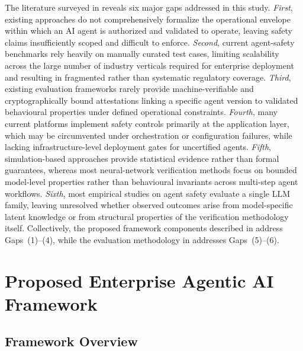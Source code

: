 \documentclass[11pt,a4paper]{article}
\begin{document}
The literature surveyed in  reveals six major
gaps addressed in this study. \emph{First}, existing approaches do
not comprehensively formalize the operational envelope within which an
AI agent is authorized and validated to operate, leaving safety claims
insufficiently scoped and difficult to enforce. \emph{Second}, current
agent-safety benchmarks \citep{liu2023agentbench, yuan2024rjudge,
andriushchenko2025agentharm, zhang2025agentsafetybench,
yin2025safeagentbench} rely heavily on manually curated test cases,
limiting scalability across the large number of industry verticals
required for enterprise deployment and resulting in fragmented rather
than systematic regulatory coverage. \emph{Third}, existing evaluation
frameworks rarely provide machine-verifiable and cryptographically
bound attestations linking a specific agent version to validated
behavioural properties under defined operational constraints.
\emph{Fourth}, many current platforms implement safety controls
primarily at the application layer, which may be circumvented under
orchestration or configuration failures, while lacking
infrastructure-level deployment gates for uncertified agents.
\emph{Fifth}, simulation-based approaches provide statistical evidence
rather than formal guarantees, whereas most neural-network
verification methods \citep{huang2020survey, katz2017reluplex,
tran2020nnv, singh2019abstract} focus on bounded model-level
properties rather than behavioural invariants across multi-step agent
workflows. \emph{Sixth}, most empirical studies on agent safety
evaluate a single LLM family, leaving unresolved whether observed
outcomes arise from model-specific latent knowledge or from structural
properties of the verification methodology itself. Collectively, the
proposed framework components described in
address Gaps~(1)--(4), while the evaluation methodology in
 addresses Gaps~(5)--(6).

\section{Proposed Enterprise Agentic AI Framework}
\label{sec:proposed-framework}

\subsection{Framework Overview}
\end{document}
